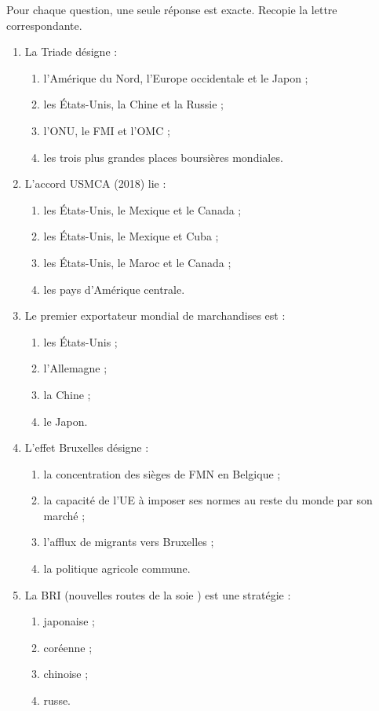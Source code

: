 \documentclass[11pt]{article}
\newcommand{\cle}[1]{{\popxbold\color{popdark}#1}}
\begin{document}
\begin{exercice}
Pour chaque question, une seule réponse est exacte. Recopie la lettre correspondante.
\begin{enumerate}
\item La \cle{Triade} désigne :
\begin{enumerate}
\item l'Amérique du Nord, l'Europe occidentale et le Japon ;
\item les États-Unis, la Chine et la Russie ;
\item l'ONU, le FMI et l'OMC ;
\item les trois plus grandes places boursières mondiales.
\end{enumerate}
\item L'accord \cle{USMCA} (2018) lie :
\begin{enumerate}
\item les États-Unis, le Mexique et le Canada ;
\item les États-Unis, le Mexique et Cuba ;
\item les États-Unis, le Maroc et le Canada ;
\item les pays d'Amérique centrale.
\end{enumerate}
\item Le premier exportateur mondial de marchandises est :
\begin{enumerate}
\item les États-Unis ; \item l'Allemagne ; \item la Chine ; \item le Japon.
\end{enumerate}
\item L'\cle{effet Bruxelles} désigne :
\begin{enumerate}
\item la concentration des sièges de FMN en Belgique ;
\item la capacité de l'UE à imposer ses normes au reste du monde par son marché ;
\item l'afflux de migrants vers Bruxelles ;
\item la politique agricole commune.
\end{enumerate}
\item La \cle{BRI} (\og nouvelles routes de la soie \fg{}) est une stratégie :
\begin{enumerate}
\item japonaise ; \item coréenne ; \item chinoise ; \item russe.

\end{enumerate}
\end{enumerate}
\end{exercice}
\end{document}
